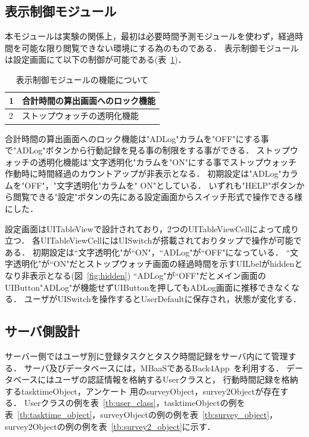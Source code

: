 \subsection{表示制御モジュール}
本モジュールは実験の関係上，最初は必要時間予測モジュールを使わず，経過時間を可能な限り閲覧できない環境にする為のものである．
表示制御モジュールは設定画面にて以下の制御が可能である(表~\ref{tb:hyoji})．
\begin{table}[htb]
\begin{center}
  \caption{表示制御モジュールの機能について}
  \begin{tabular}{|l|l|} \hline
   1 & 合計時間の算出画面へのロック機能 \\ \hline
   2 & ストップウォッチの透明化機能 \\ \hline
  \end{tabular}
  \label{tb:hyoji}
\end{center}
\end{table}
合計時間の算出画面へのロック機能は"ADLog"カラムを"OFF"にする事で"ADLog"ボタンから行動記録を見る事の制限をする事ができる．
ストップウォッチの透明化機能は"文字透明化"カラムを"ON"にする事でストップウォッチ作動時に時間経過のカウントアップが非表示となる．
初期設定は"ADLog"カラムを"OFF"，"文字透明化"カラムを" ON"としている．
いずれも"HELP"ボタンから閲覧できる"設定"ボタンの先にある設定画面からスイッチ形式で操作できる様にした．

設定画面はUITableViewで設計されており，2つのUITableViewCellによって成り立つ．
各UITableViewCellにはUISwitchが搭載されておりタップで操作が可能である．
初期設定は``文字透明化"が``ON"，``ADLog"が``OFF"になっている．
``文字透明化"が``ON"だとストップウォッチ画面の経過時間を示すUILbelがhiddenとなり非表示となる(図~\ref{fig:hidden})
``ADLog"が``OFF"だとメイン画面のUIButton"ADLog"が機能せずUIButtonを押してもADLog画面に推移できなくなる．
ユーザがUISwitchを操作するとUserDefaultに保存され，状態が変化する．

\subsection{サーバ側設計}
サーバー側ではユーザ別に登録タスクとタスク時間記録をサーバ内にて管理する．
サーバ及びデータベースには，MBaaSであるBack4App~\cite{back4app}を利用する．
データベースにはユーザの認証情報を格納するUserクラスと， 行動時間記録を格納するtasktimeObject，アンケート 用のsurveyObject，survey2Objectが存在する．
Userクラスの例を表~\ref{tb:user_class}，tasktimeObjectの例を表~\ref{tb:tasktime_object}，surveyObjectの例の例を表~\ref{tb:survey_object}，survey2Objectの例の例を表~\ref{tb:survey2_object}に示す．

